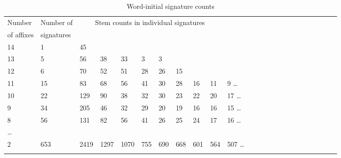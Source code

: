 \documentclass[output=paper,colorlinks,citecolor=brown,
]{langscibook}
\begin{document}
\begin{table}  
\begin{tabular}{llllllllllllllllllllllll} \lsptoprule
Number  &  Number of  & \multicolumn{8}{c}{Stem counts in  individual signatures } \\
 of affixes &   signatures & \multicolumn{8}{c}{} \\ \midrule
14 & 1 & 45  \\
13 & 5 & 56 & 38 & 33 & 3 & 3 \\
12 & 6 & 70 & 52 & 51 & 28 & 26 & 15   \\
11 & 15 & 83 & 68 & 56 & 41 & 30 & 28 & 16 & 11& 9 \ldots  \\
10 & 22 & 129 & 90 &  38 &  32 &  30 &  23 &  22 &  20 & 17    \ldots\\
9 &  34 & 205 &   46 &  32 &  29  &  20   &  19 &  16 &  16 & 15   \ldots\\
8 &   56 & 131 & 82 &  56 &  41 &  26 &  25 &  24 &  17 &  16       \ldots \\
\ldots \\
2 & 653 & 2419 &1297 & 1070 &  755 &  690 &  668 &  601 &  564 &  507    \ldots \\ \lspbottomrule
\end{tabular}
\caption{Word-initial signature counts}
\label{table2}
\end{table}
\end{document}
